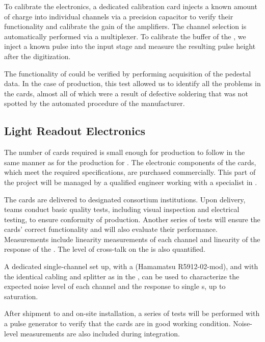 To calibrate the   electronics, a dedicated calibration card %
injects  a known amount of charge into individual  channels via a precision capacitor to verify their functionality and calibrate the gain of the amplifiers. The channel selection is automatically performed via a multiplexer. To calibrate the  buffer of the  , we inject a known pulse into the input stage and measure the resulting pulse height after the digitization. 



The functionality of  could be verified by performing acquisition of the pedestal data. In the case of  production, this test allowed us to identify all the problems in the cards, almost all of which%
were a result of defective soldering that was not spotted by the automated  procedure of the manufacturer. 


\subsection{Light Readout Electronics}
\label{ssec:dp-tpcelec-prod-lro}


The number of   cards required is small enough for production to follow in the same manner as for the production for .
The electronic components of the cards, which meet the required specifications, are purchased commercially. This part of the project will be managed by a qualified engineer working with a specialist in .

The cards are delivered to designated consortium institutions. Upon delivery, teams conduct basic quality tests, including visual inspection and electrical testing, to ensure conformity of production. Another series of tests will ensure the cards' %
correct %
functionality and will also evaluate their performance. Measurements include linearity measurements of each  channel and linearity of the response of the . The level of cross-talk on the  is also quantified. 

A dedicated single-channel set up, with a  (Hamamatsu R5912-02-mod), and with the identical cabling and splitter as in the , can be used to characterize the expected noise level of each channel and the response to single \phel{}s, up to saturation. 

After shipment to  and on-site installation, a series of tests will be performed with a pulse generator to verify that the cards are in good working condition. Noise-level measurements are also included during integration.
